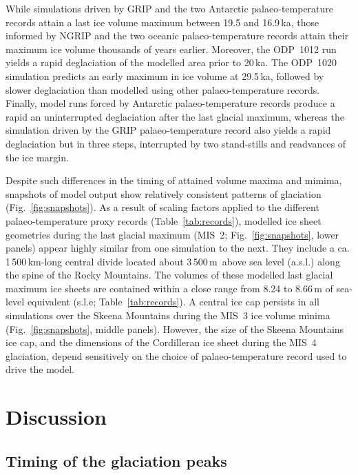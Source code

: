 \documentclass[tc, manuscript]{copernicus}
\begin{document}
While simulations driven by GRIP and the two Antarctic palaeo-temperature
records attain a last ice volume maximum between 19.5 and 16.9\,ka, those
informed by NGRIP and the two oceanic palaeo-temperature records attain their
maximum ice volume thousands of years earlier. Moreover, the ODP~1012 run
yields a rapid deglaciation of the modelled area prior to 20\,ka. The ODP~1020
simulation predicts an early maximum in ice volume at 29.5\,ka, followed by
slower deglaciation than modelled using other palaeo-temperature records.
Finally, model runs forced by Antarctic palaeo-temperature records produce a
rapid an uninterrupted deglaciation after the last glacial maximum, whereas the
simulation driven by the GRIP palaeo-temperature record also yields a rapid
deglaciation but in three steps, interrupted by two stand-stills and readvances
of the ice margin.

Despite such differences in the timing of attained volume maxima and mimima,
snapshots of model output show relatively consistent patterns of glaciation
(Fig.~\ref{fig:snapshots}). As a result of scaling factors applied to the
different palaeo-temperature proxy records (Table~\ref{tab:records}), modelled
ice sheet geometries during the last glacial maximum (MIS~2;
Fig.~\ref{fig:snapshots}, lower panels) appear highly similar from one
simulation to the next. They include a ca. 1\,500\,km-long central divide
located about 3\,500\,m\ above sea level (a.s.l.) along the spine of the Rocky
Mountains. The volumes of these modelled last glacial maximum ice sheets are
contained within a close range from 8.24 to 8.66\,m of sea-level equivalent
(s.l.e; Table~\ref{tab:records}).
A central ice cap persists in all simulations over the Skeena
Mountains during the MIS~3 ice volume minima (Fig.~\ref{fig:snapshots}, middle
panels). However, the size of the Skeena Mountains ice cap, and the dimensions
of the Cordilleran ice sheet during the MIS~4 glaciation, depend sensitively on
the choice of palaeo-temperature record used to drive the model.


\section{Discussion}
\label{sec:discussion}

\subsection{Timing of the glaciation peaks}
\end{document}
